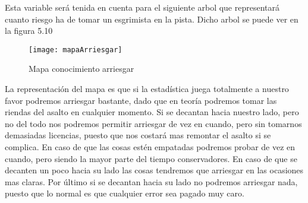 Esta variable será tenida en cuenta para el siguiente arbol que representará
cuanto riesgo ha de tomar un esgrimista en la pista. Dicho arbol se puede
ver en la figura 5.10

\begin{figure}[htb]
  \centering
    \texttt{[image: mapaArriesgar]}
  \caption[Mapa conocimiento arriesgar]{Mapa conocimiento arriesgar}
  \label{fig:Mapa conocimiento arriesgar}
\end{figure}

La representación del mapa es que si la estadística juega totalmente a nuestro favor
podremos arriesgar bastante, dado que en teoría podremos tomar las riendas del asalto
en cualquier momento. Si se decantan hacia nuestro lado, pero no del todo nos podremos
permitir arriesgar de vez en cuando, pero sin tomarnos demasiadas licencias, puesto que
nos costará mas remontar el asalto si se complica. En caso de que las cosas estén empatadas
podremos probar de vez en cuando, pero siendo la mayor parte del tiempo conservadores. En
caso de que se decanten un poco hacia su lado las cosas tendremos que arriesgar en las ocasiones
mas claras. Por último si se decantan hacia su lado no podremos arriesgar nada, puesto que lo normal
es que cualquier error sea pagado muy caro.
